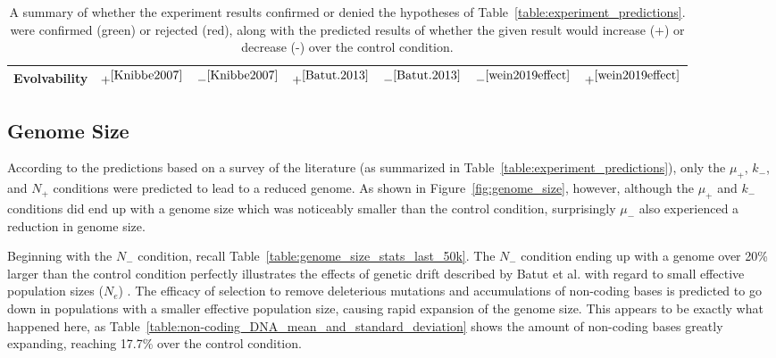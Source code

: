 \begin{table}[H]
\begin{tabular}{|c||c|c|c|c|c|c|}
		\hline
		Evolvability &\cellcolor{green} $+^{\cite{Knibbe2007}}$ &\cellcolor{green} $-^{\cite{Knibbe2007}}$ & \cellcolor{red}  $+^{\cite{Batut.2013}}$ & \cellcolor{red} $-^{\cite{Batut.2013}}$ & $-^{\cite{wein2019effect}}$ & \cellcolor{green} $+^{\cite{wein2019effect}}$ \\
		\hline		
	\end{tabular}
	\caption[Experiment result summary]{A summary of whether the experiment results confirmed or denied the hypotheses of Table~\ref{table:experiment_predictions}.  were confirmed ({\color{green}green}) or rejected ({\color{red}red}), along with the predicted results of whether the given result would increase (+) or decrease (-) over the control condition.}
	\label{table:experiment_results_summary}
\end{table}
\subsection{Genome Size}

According to the predictions based on a survey of the literature (as summarized in Table~\ref{table:experiment_predictions}), only the $\mu_+$, $k_-$, and $N_+$ conditions were predicted to lead to a reduced genome. As shown in Figure~\ref{fig:genome_size}, however, although the $\mu_+$ and $k_-$ conditions did end up with a genome size which was noticeably smaller than the control condition, surprisingly $\mu_-$ also experienced a reduction in genome size. %

Beginning with the $N_-$ condition, recall Table~\ref{table:genome_size_stats_last_50k}. The $N_-$ condition ending up with a genome over 20\% larger than the control condition perfectly illustrates the effects of genetic drift described by Batut et al. with regard to small effective population sizes ($N_e$) \cite{Batut.2014}. The efficacy of selection to remove deleterious mutations and accumulations of non-coding bases is predicted to go down in populations with a smaller effective population size, causing rapid expansion of the genome size. This appears to be exactly what happened here, as Table~\ref{table:non-coding_DNA_mean_and_standard_deviation} shows the amount of non-coding bases greatly expanding, reaching 17.7\% over the control condition. 


